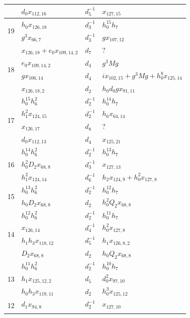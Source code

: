 \begin{table}[htbp]
{\begin{tabular}{|c|l|l|l|}
 & $d_0x_{112,16}$ & $d_{5}^{-1}$ & $x_{127,15}$ \\\hline\hline
\multirow{2}{*}{19} & $h_0x_{126,18}$ & $d_{3}^{-1}$ & $h_0^{15}h_7$ \\\cline{2-4}
 & $g^3x_{66,7}$ & $d_{3}^{-1}$ & $gx_{107,12}$ \\\hline\hline
\multirow{4}{*}{18} & $x_{126,18}+e_0x_{109,14,2}$ & $d_{7}$ & $?$ \\\cline{2-4}
 & $e_0x_{109,14,2}$ & $d_{4}$ & $g^3Mg$ \\\cline{2-4}
 & $gx_{106,14}$ & $d_{4}$ & $ix_{102,15}+g^3Mg+h_0^8x_{125,14}$ \\\cline{2-4}
 & $x_{126,18,2}$ & $d_{2}$ & $h_0d_0gx_{91,11}$ \\\hline\hline
\multirow{4}{*}{17} & $h_0^{15}h_6^2$ & $d_{2}^{-1}$ & $h_0^{14}h_7$ \\\cline{2-4}
 & $h_1^2x_{124,15}$ & $d_{2}^{-1}$ & $h_6x_{64,14}$ \\\cline{2-4}
 & $x_{126,17}$ & $d_{8}$ & $?$ \\\cline{2-4}
 & $d_0x_{112,13}$ & $d_{4}$ & $x_{125,21}$ \\\hline\hline
\multirow{3}{*}{16} & $h_0^{14}h_6^2$ & $d_{2}^{-1}$ & $h_0^{13}h_7$ \\\cline{2-4}
 & $h_0^2D_2x_{68,8}$ & $d_{3}^{-1}$ & $x_{127,13}$ \\\cline{2-4}
 & $h_1^2x_{124,14}$ & $d_{6}^{-1}$ & $h_2x_{124,9}+h_0^2x_{127,8}$ \\\hline\hline
\multirow{2}{*}{15} & $h_0^{13}h_6^2$ & $d_{2}^{-1}$ & $h_0^{12}h_7$ \\\cline{2-4}
 & $h_0D_2x_{68,8}$ & $d_{2}$ & $h_0^2Q_2x_{68,8}$ \\\hline\hline
\multirow{4}{*}{14} & $h_0^{12}h_6^2$ & $d_{2}^{-1}$ & $h_0^{11}h_7$ \\\cline{2-4}
 & $x_{126,14}$ & $d_{4}^{-1}$ & $h_0^2x_{127,8}$ \\\cline{2-4}
 & $h_1h_3x_{118,12}$ & $d_{5}^{-1}$ & $h_1x_{126,8,2}$ \\\cline{2-4}
 & $D_2x_{68,8}$ & $d_{2}$ & $h_0Q_2x_{68,8}$ \\\hline\hline
\multirow{3}{*}{13} & $h_0^{11}h_6^2$ & $d_{2}^{-1}$ & $h_0^{10}h_7$ \\\cline{2-4}
 & $h_1x_{125,12,2}$ & $d_{5}$ & $d_0^2x_{97,10}$ \\\cline{2-4}
 & $h_0h_3x_{119,11}$ & $d_{2}$ & $h_0^3x_{125,12}$ \\\hline\hline
\multirow{5}{*}{12} & $d_1x_{94,8}$ & $d_{2}^{-1}$ & $x_{127,10}$ \\\cline{2-4}

\end{tabular}}
\end{table}
